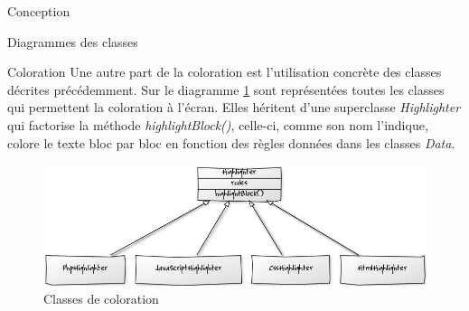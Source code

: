 \documentclass[a4paper, 12pt]{report}
\begin{document}
\begin{part}{Conception}
\begin{chapter}{Diagrammes des classes}
\begin{section}{Coloration}
				Une autre part de la coloration est l'utilisation concrète des classes décrites précédemment. Sur le diagramme \ref{bicyclette} sont
				représentées toutes les classes qui permettent la coloration à l'écran. Elles héritent d'une superclasse
				\emph{Highlighter} qui factorise la méthode \emph{highlightBlock()}, celle-ci, comme son nom l'indique, colore le texte bloc
				par bloc en fonction des règles données dans les classes \emph{Data}.
				\begin{figure}[ht]
					\begin{center}
						\includegraphics[width=15cm]{images/classesColoration.jpg}
						\caption{Classes de coloration}
						\label{bicyclette}
					\end{center}
				\end{figure}~\\


\end{section}
\end{chapter}
\end{part}
\end{document}
